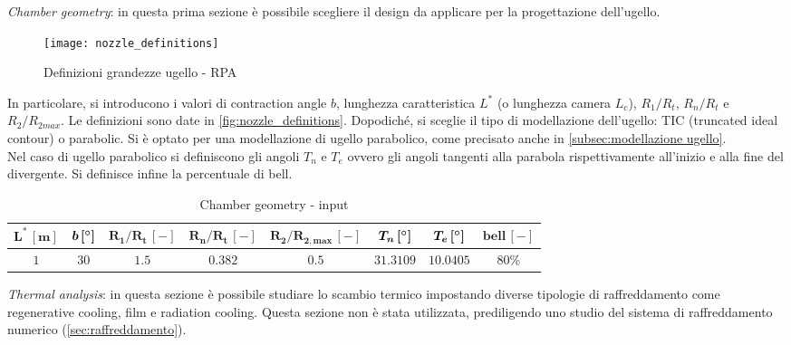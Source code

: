 \begin{itemize}

\parbox[t]{\dimexpr\textwidth-\leftmargin}{%
\item \textit{Chamber geometry}: in questa prima sezione è possibile scegliere il design da applicare per la progettazione dell'ugello.
\begin{wrapfigure}{r}{0.4\linewidth}
	\centering
	\vspace{-\baselineskip}
	\texttt{[image: nozzle\_definitions]}
	\caption{Definizioni grandezze ugello - RPA }
	\label{fig:nozzle_definitions}
\end{wrapfigure}
In particolare, si introducono i valori di contraction angle $b$, lunghezza caratteristica $L^*$ (o lunghezza camera $L_c$), $R_1/R_t$, $R_n/R_t$ e $R_2/R_{2max}$. Le definizioni sono date in \autoref{fig:nozzle_definitions}. Dopodiché, si sceglie il tipo di modellazione dell'ugello: TIC (truncated ideal contour) o parabolic. Si è optato per una modellazione di ugello parabolico, come precisato anche in  \autoref{subsec:modellazione ugello}. \\
Nel caso di ugello parabolico si definiscono gli angoli $T_n$ e $T_e$ ovvero gli angoli tangenti alla parabola rispettivamente all'inizio e alla fine del divergente. Si definisce infine la percentuale di bell.
\begin{table}[H]
\centering
\begin{tabular}{|c|c|c|c|c|c|c|c|}
\hline
$\bm{L^* \, [m]}$ & $\bm{b \, [\degree]}$ & $\bm{R_1/R_t \, [-]}$ & $\bm{R_n/R_t \, [-]}$ & $\bm{R_2/R_{2,max} \, [-]}$  & $\bm{T_n \, [\degree]}$ &  $\bm{T_e \, [\degree]}$ & $\bm{bell \, [-]}$ \\
\hline
$1$ & $30$ & $1.5$ & $0.382$ & $0.5$ & $31.3109$ & $10.0405$ & $80$\% \\
\hline
\end{tabular}
\caption{Chamber geometry - input}
\label{table:chamb_input}
\end{table}
}

\item \textit{Thermal analysis}: in questa sezione è possibile studiare lo scambio termico impostando diverse tipologie di raffreddamento come regenerative cooling, film e radiation cooling. Questa sezione non è stata utilizzata, prediligendo uno studio del sistema di raffreddamento numerico (\autoref{sec:raffreddamento}).


\end{itemize}

